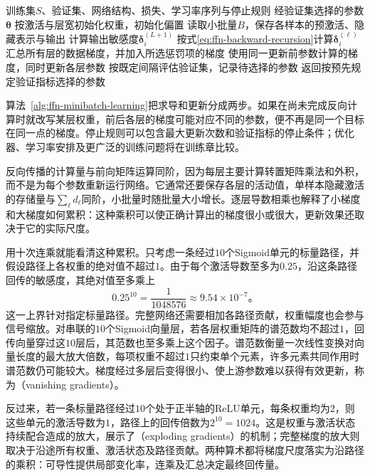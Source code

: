 \begin{algorithm}[前馈网络的小批量梯度学习]
  \label{alg:ffn-minibatch-learning}
  \begin{algorithmic}[1]
    \Require 训练集$S$、验证集、网络结构、损失、学习率序列与停止规则
    \Ensure 经验证集选择的参数$\bm{\theta}$
    \State 按激活与层宽初始化权重，初始化偏置
      \State 读取小批量$B$，保存各样本的预激活、隐藏表示与输出
      \State 计算输出敏感度$\bm{\delta}_i^{(L+1)}$
        \State 按式\eqref{eq:ffn-backward-recursion}计算$\bm{\delta}_i^{(\ell)}$
      \EndFor
      \State 汇总所有层的数据梯度，并加入所选惩罚项的梯度
      \State 使用同一更新前参数计算的梯度，同时更新各层参数
      \State 按既定间隔评估验证集，记录待选择的参数
    \EndWhile
    \State 返回按预先规定验证指标选择的参数
  \end{algorithmic}
\end{algorithm}

算法~\ref{alg:ffn-minibatch-learning}把求导和更新分成两步。如果在尚未完成反向计算时就改写某层权重，前后各层的梯度可能对应不同的参数，便不再是同一个目标在同一点的梯度。停止规则可以包含最大更新次数和验证指标的停止条件；优化器、学习率安排及更广泛的训练问题将在训练章比较。

反向传播的计算量与前向矩阵运算同阶，因为每层主要计算转置矩阵乘法和外积，而不是为每个参数重新运行网络。它通常还要保存各层的活动值，单样本隐藏激活的存储量与$\sum_\ell d_\ell$同阶，小批量时随批量大小增长。逐层导数相乘也解释了小梯度和大梯度如何累积：这种乘积可以使正确计算出的梯度很小或很大，更新效果还取决于它的实际尺度。

用十次连乘就能看清这种累积。只考虑一条经过$10$个Sigmoid单元的标量路径，并假设路径上各权重的绝对值不超过$1$。由于每个激活导数至多为$0.25$，沿这条路径回传的敏感度，其绝对值至多乘上
\[
  0.25^{10}=\frac{1}{1048576}\approx9.54\times10^{-7}\text{。}
\]
这一上界针对指定标量路径。完整网络还需要相加各路径贡献，权重幅度也会参与信号缩放。对串联的$10$个Sigmoid向量层，若各层权重矩阵的谱范数均不超过$1$，回传向量穿过这$10$层后，其范数也至多乘上这个因子。谱范数衡量一次线性变换对向量长度的最大放大倍数，每项权重不超过$1$只约束单个元素，许多元素共同作用时谱范数仍可能较大。梯度经过多层后变得很小、使上游参数难以获得有效更新，称为（vanishing gradients）。

反过来，若一条标量路径经过$10$个处于正半轴的ReLU单元，每条权重均为$2$，则这些单元的激活导数为$1$，路径上的回传倍数为$2^{10}=1024$。这是权重与激活状态持续配合造成的放大，展示了（exploding gradients）的机制；完整梯度的放大则取决于沿途所有权重、激活状态及路径贡献。两种算术都将梯度尺度落实为沿路径的乘积：可导性提供局部变化率，连乘及汇总决定最终回传量。

